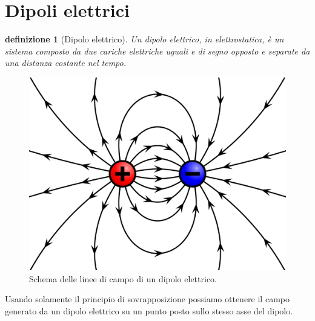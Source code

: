 \documentclass[10pt,a4paper]{article}
\newtheorem{definizione}{definizione}
\begin{document}
\section{Dipoli elettrici}
\begin{definizione}[Dipolo elettrico]
	Un dipolo elettrico, in elettrostatica, è un sistema composto da due cariche elettriche uguali e di segno opposto e separate da una distanza costante nel tempo.
\end{definizione}
\begin{figure}[h!]
	\centering
	\includegraphics[width=0.4\linewidth]{images/dipolo_elettrico}
	\caption{Schema delle linee di campo di un dipolo elettrico.}
	\label{fig:dipoloelettrico}
\end{figure}
\FloatBarrier
Usando solamente il principio di sovrapposizione possiamo ottenere il campo generato da un dipolo elettrico su un punto posto sullo stesso asse del dipolo.
\end{document}
